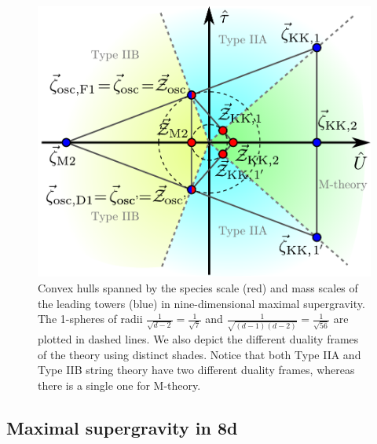 \begin{figure}[htb]
	\begin{center}
		\includegraphics[scale=.55]{MaxSugra9dNEW.pdf}
		\caption{\small Convex hulls spanned by the species scale (red) and mass scales of the leading towers (blue) in nine-dimensional maximal supergravity. The 1-spheres of radii $\frac{1}{\sqrt{d-2}}=\frac{1}{\sqrt{7}}$ and $\frac{1}{\sqrt{(d-1)(d-2)}}=\frac{1}{\sqrt{56}}$ are plotted in dashed lines. We also depict the different duality frames of the theory using distinct shades. Notice that both Type IIA and Type IIB string theory have two different duality frames, whereas there is a single one for M-theory.} 
		\label{fig:T2SDC&SSDC}
	\end{center}
\end{figure}
	
	
\subsection{Maximal supergravity in 8d}
\label{ss:8d}
	
